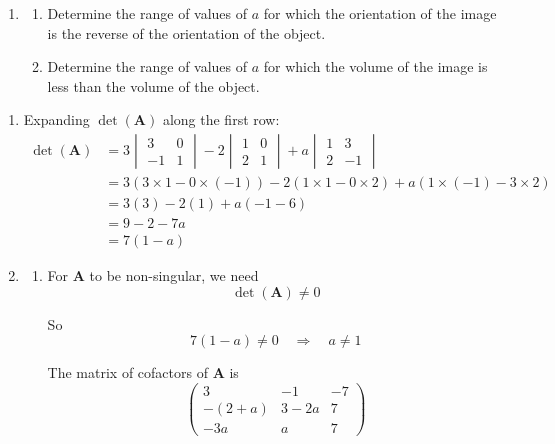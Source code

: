 \documentclass[leqno]{article}
\begin{document}
\begin{enumerate}[
  label=\textbf{\arabic*.},
  leftmargin=*,
  topsep=0pt,
  partopsep=0pt,
  parsep=0pt
]
\begin{enumerate}[label=\textbf{(\alph*)}, resume]
  \item
  \begin{enumerate}[label=(\roman*)]
    \item Determine the range of values of $a$ for which the orientation of the image is the reverse of the orientation of the object. 
    \item Determine the range of values of $a$ for which the volume of the image is less than the volume of the object.  \\
  \end{enumerate}
\end{enumerate}

\vspace*{10pt}

\begin{djsSolution}
\begin{enumerate}[label=\textbf{(\alph*)}]
  \item Expanding $\det(\mathbf{A})$ along the first row:
\begin{align*}
\det(\mathbf{A})
&= 3\begin{vmatrix}3&0\\-1&1\end{vmatrix}
-2\begin{vmatrix}1&0\\2&1\end{vmatrix}
+a\begin{vmatrix}1&3\\2&-1\end{vmatrix} \\
&= 3(3\times 1-0\times(-1))
-2(1\times 1-0\times 2)
+a(1\times(-1)-3\times 2) \\
&= 3(3)-2(1)+a(-1-6) \\
&= 9-2-7a \\
&= 7(1-a)
\end{align*}

  \item \begin{enumerate}[label=(\roman*)]
    \item For $\mathbf{A}$ to be non-singular, we need
\[
\det(\mathbf{A})\neq 0
\]

So
\[
7(1-a)\neq 0\quad\Longrightarrow\quad a\neq 1
\]

The matrix of cofactors of $\mathbf{A}$ is
\[
\begin{pmatrix}
3 & -1 & -7 \\
-(2+a) & 3-2a & 7 \\
-3a & a & 7
\end{pmatrix}
\]


\end{enumerate}
\end{enumerate}
\end{djsSolution}
\end{enumerate}
\end{document}
